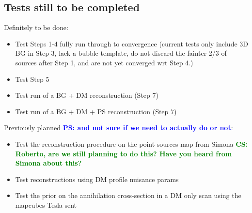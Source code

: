 \documentclass{article}
\newcommand{\cs}[1]{\textcolor{green}{{\bf CS: #1}}}
\newcommand{\ps}[1]{\textcolor{blue}{{\bf PS: #1}}}
\begin{document}
\subsection{Tests still to be completed}

Definitely to be done:
\begin{itemize}
\item Test Steps 1-4 fully run through to convergence (current tests only include 3D BG in Step 3, lack a bubble template, do not discard the fainter 2/3 of sources after Step 1, and are not yet converged wrt Step 4.)
\item Test Step 5
\item Test run of a BG + DM reconstruction (Step 7)
\item Test run of a BG + DM + PS reconstruction (Step 7)
\end{itemize}

Previously planned \ps{and not sure if we need to actually do or not}:
\begin{itemize}
\item Test the reconstruction procedure on the point sources map from Simona \cs{Roberto, are we still planning to do this? Have you heard from Simona about this?}
\item Test reconstructions using DM profile nuisance params
\item Test the prior on the annihilation cross-section in a DM only scan using the mapcubes Tesla sent
\end{itemize}
\end{document}
